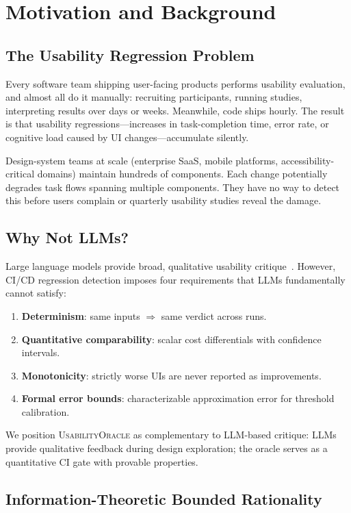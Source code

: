 \documentclass[11pt,twocolumn]{article}
\theoremstyle{definition}
\newcommand{\tool}{\textsc{UsabilityOracle}}
\begin{document}
\section{Motivation and Background}
\label{sec:motivation}

\subsection{The Usability Regression Problem}

Every software team shipping user-facing products performs usability evaluation, and almost all do it manually: recruiting participants, running studies, interpreting results over days or weeks.
Meanwhile, code ships hourly.
The result is that usability regressions---increases in task-completion time, error rate, or cognitive load caused by UI changes---accumulate silently.

Design-system teams at scale (enterprise SaaS, mobile platforms, accessibility-critical domains) maintain hundreds of components.
Each change potentially degrades task flows spanning multiple components.
They have no way to detect this before users complain or quarterly usability studies reveal the damage.

\subsection{Why Not LLMs?}

Large language models provide broad, qualitative usability critique~\citep{feng2024llmusability}.
However, CI/CD regression detection imposes four requirements that LLMs fundamentally cannot satisfy:
\begin{enumerate}[nosep]
  \item \textbf{Determinism}: same inputs $\Rightarrow$ same verdict across runs.
  \item \textbf{Quantitative comparability}: scalar cost differentials with confidence intervals.
  \item \textbf{Monotonicity}: strictly worse UIs are never reported as improvements.
  \item \textbf{Formal error bounds}: characterizable approximation error for threshold calibration.
\end{enumerate}
We position \tool{} as complementary to LLM-based critique: LLMs provide qualitative feedback during design exploration; the oracle serves as a quantitative CI gate with provable properties.

\subsection{Information-Theoretic Bounded Rationality}
\end{document}
